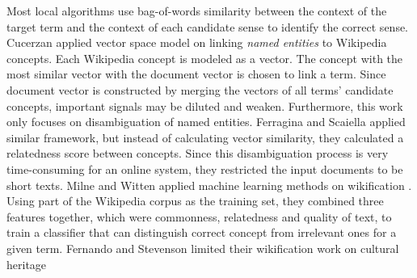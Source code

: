 Most local algorithms use bag-of-words similarity between
the context of the target term and the context of each candidate sense
to identify the correct sense.
Cucerzan \cite{cucerzan2007large} applied vector space model on linking
{\em named entities} to Wikipedia concepts. Each Wikipedia concept is
modeled as a vector. The concept with the most similar vector with the
document vector is chosen to link a term.
Since document vector is constructed by merging the vectors of all terms' candidate
concepts, important signals may be diluted and weaken.
Furthermore, this work only focuses on disambiguation of named entities.
Ferragina and Scaiella \cite{ferragina2010tagme} applied similar framework, but instead
of calculating vector similarity, they calculated a relatedness score between concepts.
Since this disambiguation process is very time-consuming for an online system,
they restricted the input documents to be short texts.
Milne and Witten applied machine learning methods on wikification
\cite{milne2008learning}.
Using part of the Wikipedia corpus as the training set, they combined three
features together, which were commonness, relatedness and quality of text,
to train a classifier that
can distinguish correct concept from irrelevant ones for a given term.
Fernando and Stevenson limited their wikification work on cultural heritage
